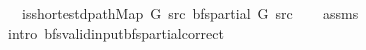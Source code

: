 \begin{isabellebody}
\ \ \ {\isachardoublequoteopen}is{\isacharunderscore}{\kern0pt}shortest{\isacharunderscore}{\kern0pt}dpath{\isacharunderscore}{\kern0pt}Map\ G\ src\ {\isacharparenleft}{\kern0pt}bfs{\isacharunderscore}{\kern0pt}partial\ G\ src{\isacharparenright}{\kern0pt}{\isachardoublequoteclose}\isanewline
%
\isadelimproof
\ \ %
\endisadelimproof
%
\isatagproof
{}\isamarkupfalse%
\ assms\isanewline
\ \ \isamarkupfalse%
\ {\isacharparenleft}{\kern0pt}intro\ bfs{\isacharunderscore}{\kern0pt}valid{\isacharunderscore}{\kern0pt}input{\isachardot}{\kern0pt}bfs{\isacharunderscore}{\kern0pt}partial{\isacharunderscore}{\kern0pt}correct{\isacharparenright}{\kern0pt}%
\endisatagproof
{\isafoldproof}%
%
\isadelimproof
\isanewline
%
\endisadelimproof
%
\isadelimtheory
\isanewline
%
\endisadelimtheory
%
\isatagtheory
{}\isamarkupfalse%
%
\endisatagtheory
{\isafoldtheory}%
%
\isadelimtheory
%
\endisadelimtheory
%
\end{isabellebody}%
\endinput
